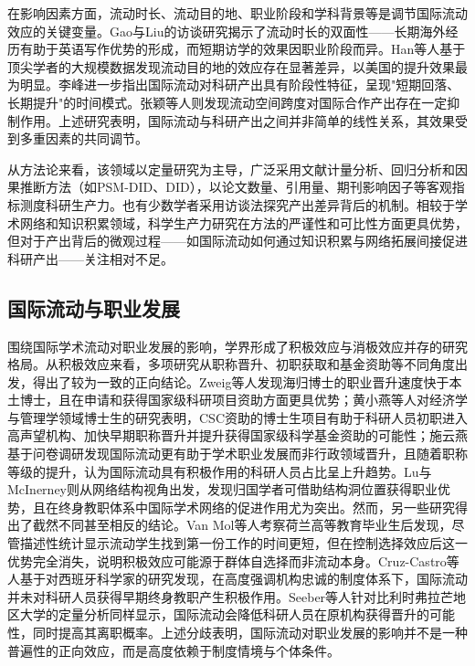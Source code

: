 在影响因素方面，流动时长、流动目的地、职业阶段和学科背景等是调节国际流动效应的关键变量。Gao与Liu的访谈研究揭示了流动时长的双面性------长期海外经历有助于英语写作优势的形成，而短期访学的效果因职业阶段而异\cite{gao2021}。Han等人基于顶尖学者的大规模数据发现流动目的地的效应存在显著差异，以美国的提升效果最为明显\cite{han2024}。李峰进一步指出国际流动对科研产出具有阶段性特征，呈现"短期回落、长期提升"的时间模式\cite{lifeng2018}。张颖等人则发现流动空间跨度对国际合作产出存在一定抑制作用\cite{zhangying2024}。上述研究表明，国际流动与科研产出之间并非简单的线性关系，其效果受到多重因素的共同调节。

从方法论来看，该领域以定量研究为主导，广泛采用文献计量分析、回归分析和因果推断方法（如PSM-DID、DID），以论文数量、引用量、期刊影响因子等客观指标测度科研生产力。也有少数学者采用访谈法探究产出差异背后的机制。相较于学术网络和知识积累领域，科学生产力研究在方法的严谨性和可比性方面更具优势，但对于产出背后的微观过程------如国际流动如何通过知识积累与网络拓展间接促进科研产出------关注相对不足。

\subsection{国际流动与职业发展}

围绕国际学术流动对职业发展的影响，学界形成了积极效应与消极效应并存的研究格局。从积极效应来看，多项研究从职称晋升、初职获取和基金资助等不同角度出发，得出了较为一致的正向结论。Zweig等人发现海归博士的职业晋升速度快于本土博士，且在申请和获得国家级科研项目资助方面更具优势\cite{zweig2004}；黄小燕等人对经济学与管理学领域博士生的研究表明，CSC资助的博士生项目有助于科研人员初职进入高声望机构、加快早期职称晋升并提升获得国家级科学基金资助的可能性\cite{huangxiaoyan2026}；施云燕基于问卷调研发现国际流动更有助于学术职业发展而非行政领域晋升，且随着职称等级的提升，认为国际流动具有积极作用的科研人员占比呈上升趋势\cite{shiyunyan2017}。Lu与McInerney则从网络结构视角出发，发现归国学者可借助结构洞位置获得职业优势，且在终身教职体系中国际学术网络的促进作用尤为突出\cite{lu2016}。然而，另一些研究得出了截然不同甚至相反的结论。Van Mol等人考察荷兰高等教育毕业生后发现，尽管描述性统计显示流动学生找到第一份工作的时间更短，但在控制选择效应后这一优势完全消失，说明积极效应可能源于群体自选择而非流动本身\cite{vanmol2021}。Cruz-Castro等人基于对西班牙科学家的研究发现，在高度强调机构忠诚的制度体系下，国际流动并未对科研人员获得早期终身教职产生积极作用\cite{cruzcastro2010}。Seeber等人针对比利时弗拉芒地区大学的定量分析同样显示，国际流动会降低科研人员在原机构获得晋升的可能性，同时提高其离职概率\cite{seeber2023}。上述分歧表明，国际流动对职业发展的影响并不是一种普遍性的正向效应，而是高度依赖于制度情境与个体条件。

